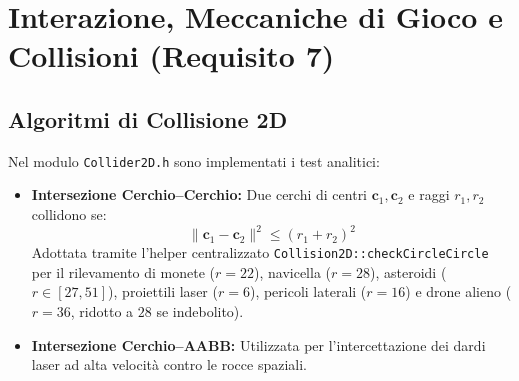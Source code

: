 \documentclass[11pt,a4paper]{article}
\begin{document}
\section{Interazione, Meccaniche di Gioco e Collisioni (Requisito 7)}

\subsection{Algoritmi di Collisione 2D}
Nel modulo \texttt{Collider2D.h} sono implementati i test analitici:
\begin{itemize}
    \item \textbf{Intersezione Cerchio--Cerchio:} Due cerchi di centri $\mathbf{c}_1, \mathbf{c}_2$ e raggi $r_1, r_2$ collidono se:
    \begin{equation}
    \|\mathbf{c}_1 - \mathbf{c}_2\|^2 \le (r_1 + r_2)^2
    \end{equation}
    Adottata tramite l'helper centralizzato \texttt{Collision2D::checkCircleCircle} per il rilevamento di monete ($r=22$), navicella ($r=28$), asteroidi ($r \in [27, 51]$), proiettili laser ($r=6$), pericoli laterali ($r=16$) e drone alieno ($r=36$, ridotto a $28$ se indebolito).
    \item \textbf{Intersezione Cerchio--AABB:} Utilizzata per l'intercettazione dei dardi laser ad alta velocità contro le rocce spaziali.
\end{itemize}
\end{document}
